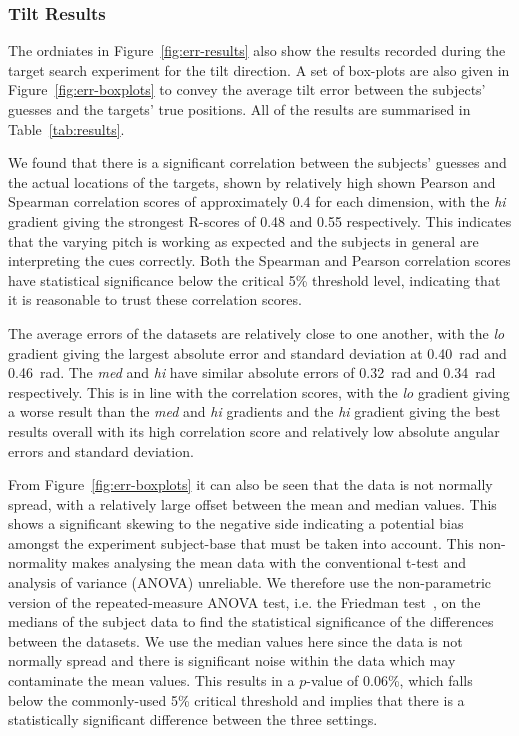 \documentclass[format=sigconf, review=true, screen=true, anonymous=true]{acmart}
\begin{document}
\subsubsection{Tilt Results}
\label{sec:tilt-results}

The ordniates in Figure~\ref{fig:err-results} also show the results recorded during the target search experiment for the tilt direction. A set of box-plots are also given in Figure~\ref{fig:err-boxplots} to convey the average tilt error between the subjects' guesses and the targets' true positions. All of the results are summarised in Table~\ref{tab:results}.

We found that there is a significant correlation between the subjects' guesses and the actual locations of the targets, shown by relatively high shown Pearson and Spearman correlation scores of approximately 0.4 for each dimension, with the \emph{hi} gradient giving the strongest R-scores of 0.48 and 0.55 respectively. This indicates that the varying pitch is working as expected and the subjects in general are interpreting the cues correctly. Both the Spearman and Pearson correlation scores have statistical significance below the critical 5\% threshold level, indicating that it is reasonable to trust these correlation scores. 

The average errors of the datasets are relatively close to one another, with the \emph{lo} gradient giving the largest absolute error and standard deviation at \SI{0.40}{\radian} and \SI{0.46}{\radian}. The \emph{med} and \emph{hi} have similar absolute errors of \SI{0.32}{\radian} and \SI{0.34}{\radian} respectively. This is in line with the correlation scores, with the \emph{lo} gradient giving a worse result than the \emph{med} and \emph{hi} gradients and the \emph{hi} gradient giving the best results overall with its high correlation score and relatively low absolute angular errors and standard deviation. 

From Figure~\ref{fig:err-boxplots} it can also be seen that the data is not normally spread, with a relatively large offset between the mean and median values. This shows a significant skewing to the negative side indicating a potential bias amongst the experiment subject-base that must be taken into account. This non-normality makes analysing the mean data with the conventional t-test and analysis of variance (ANOVA) unreliable. We therefore use the non-parametric version of the repeated-measure ANOVA test, i.e. the Friedman test~\cite{friedman1937use}, on the medians of the subject data to find the statistical significance of the differences between the datasets. We use the median values here since the data is not normally spread and there is significant noise within the data which may contaminate the mean values. This results in a $p$-value of 0.06\%, which falls below the commonly-used 5\% critical threshold and implies that there is a statistically significant difference between the three settings.  
\end{document}
